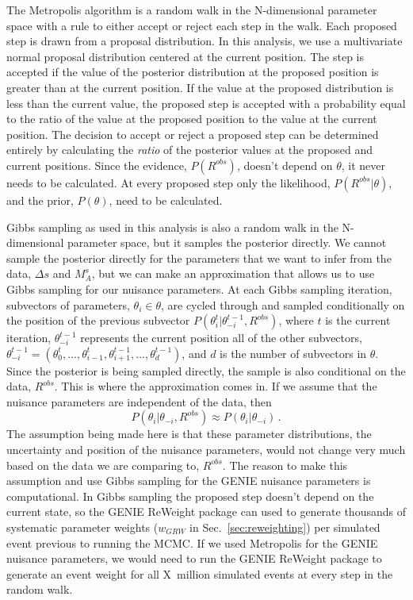     The Metropolis algorithm is a random walk in the N-dimensional parameter
    space with a rule to either accept or reject each step in the walk. Each
    proposed step is drawn from a proposal distribution.  In this analysis, we
    use a multivariate normal proposal distribution centered at the current
    position.  The step is accepted if the value of the posterior distribution
    at the proposed position is greater than at the current position. If the
    value at the proposed distribution is less than the current value, the
    proposed step is accepted with a probability equal to the ratio of the
    value at the proposed position to the value at the current position. The
    decision to accept or reject a proposed step can be determined entirely by
    calculating the \textit{ratio} of the posterior values at the proposed and
    current positions. Since the evidence, $P(R^{obs})$, doesn't depend on
    $\theta$, it never needs to be calculated. At every proposed step only the
    likelihood, $P(R^{obs}|\theta)$, and the prior, $P(\theta)$, need to be
    calculated.

    Gibbs sampling as used in this analysis is also a random walk in the
    N-dimensional parameter space, but it samples the posterior directly. We
    cannot sample the posterior directly for the parameters that we want to
    infer from the data, $\Delta s$ and $M_A^s$, but we can make an
    approximation that allows us to use Gibbs sampling for our nuisance
    parameters. At each Gibbs sampling iteration, subvectors of parameters,
    $\theta_i \in \theta$, are cycled through and sampled conditionally on the
    position of the previous subvector
    $P(\theta_i^t|\theta_{-i}^{t-1},R^{obs})$, where $t$ is the current
    iteration, $\theta_{-i}^{t-1}$ represents the current position all of the
    other subvectors, $\theta_{-i}^{t-1} =
    (\theta_0^t,...,\theta_{i-1}^t,\theta_{i+1}^{t-1},...,\theta_d^{t-1})$, and
    $d$ is the number of subvectors in $\theta$.  Since the posterior is being
    sampled directly, the sample is also conditional on the data, $R^{obs}$.
    This is where the approximation comes in. If we assume that the nuisance
    parameters are independent of the data, then
    \begin{equation}\label{eq:gibbsstep}
      P(\theta_i|\theta_{-i},R^{obs}) \approx P(\theta_i|\theta_{-i}) \,.
    \end{equation}
    The assumption being made here is that these parameter distributions, the
    uncertainty and position of the nuisance parameters, would not change very
    much based on the data we are comparing to, $R^{obs}$. The reason to make
    this assumption and use Gibbs sampling for the GENIE nuisance parameters is
    computational. In Gibbs sampling the proposed step doesn't depend on the
    current state, so the GENIE ReWeight package can used to generate thousands
    of systematic parameter weights ($w_{GRW}$ in Sec.~\ref{sec:reweighting})
    per simulated event previous to running the MCMC. If we used Metropolis for
    the GENIE nuisance parameters, we would need to run the GENIE ReWeight
    package to generate an event weight for all X~million simulated events at
    every step in the random walk.

